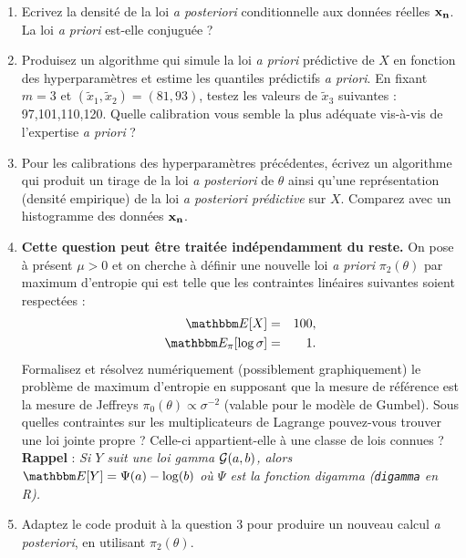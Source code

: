 \begin{enumerate}
\item Ecrivez la densité de la loi {\it a posteriori} conditionnelle aux donn\'ees r\'eelles ${\bf x_n}$. La loi {\it a priori} est-elle conjuguée ? 
\item Produisez un algorithme qui simule la loi {\it a priori} prédictive de $X$ en fonction des hyperparamètres et estime les quantiles prédictifs {\it a priori}. En fixant $m=3$ et $(\tilde{x}_1,\tilde{x}_2)=(81,93)$, testez les valeurs de $\tilde{x}_3$ suivantes : 97,101,110,120. Quelle calibration vous semble la plus adéquate vis-à-vis de l'expertise {\it a priori} ? 
\item Pour les calibrations des hyperparamètres précédentes, écrivez un algorithme qui produit un tirage de la loi {\it a posteriori} de $\theta$ ainsi qu'une représentation (densité empirique) de la loi {\it a posteriori prédictive} sur $X$. Comparez avec un histogramme des données ${\bf x_n}$. 
\item {\bf Cette question peut être traitée indépendamment du reste.} On pose à présent $\mu>0$ et on cherche à définir une nouvelle loi {\it a priori} $\pi_2(\theta)$ par maximum d'entropie qui est telle que les contraintes linéaires suivantes soient respectées :
\begin{eqnarray*}
\E[X] & = & 100, \\
\E_{\pi}[\log \sigma] & = & 1.
\end{eqnarray*}
Formalisez et résolvez numériquement (possiblement graphiquement) le problème de maximum d'entropie en supposant que la mesure de référence est la mesure de Jeffreys $\pi_0(\theta) \propto \sigma^{-2}$ (valable pour le modèle de Gumbel). Sous quelles contraintes sur les multiplicateurs de Lagrange pouvez-vous trouver une loi jointe propre ? Celle-ci appartient-elle à une classe de lois connues ? \\

{\bf Rappel} : {\it Si $Y$ suit une loi gamma ${\cal{G}}(a,b)$, alors $\E[Y]=\Psi(a)-\log(b)$ où $\Psi$ est la fonction digamma (\texttt{digamma} en R). } \\

\item Adaptez le code produit à la question 3 pour produire un nouveau calcul {\it a posteriori}, en utilisant $\pi_2(\theta)$.
\end{enumerate}


